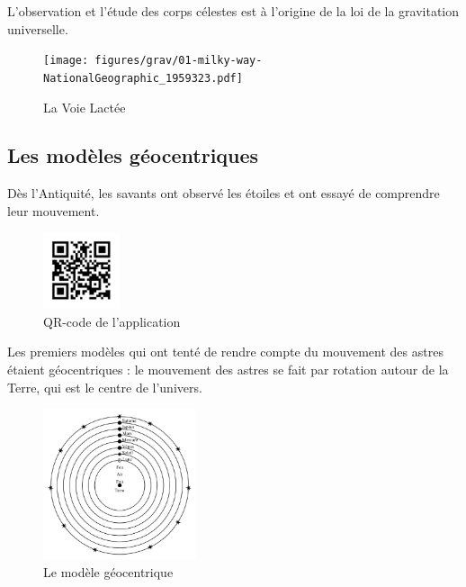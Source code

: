 \documentclass[
  letterpaper,
  DIV=11,
  numbers=noendperiod]{scrartcl}
\theoremstyle{definition}
\theoremstyle{definition}
\theoremstyle{definition}
\theoremstyle{remark}
\begin{document}
L'observation et l'étude des corps célestes est à l'origine de la loi de
la gravitation universelle.

\begin{figure}[H]

{\centering \texttt{[image: figures/grav/01-milky-way-NationalGeographic\_1959323.pdf]}

}

\caption{La Voie Lactée}

\end{figure}%

\subsection{Les modèles
géocentriques}\label{les-moduxe8les-guxe9ocentriques}

Dès l'Antiquité, les savants ont observé les étoiles et ont essayé de
comprendre leur mouvement.

\begin{figure}[H]

{\centering \includegraphics[width=0.2\textwidth,height=\textheight]{figures/grav/stell.pdf}

}

\caption{QR-code de l'application}

\end{figure}%

Les premiers modèles qui ont tenté de rendre compte du mouvement des
astres étaient géocentriques : le mouvement des astres se fait par
rotation autour de la Terre, qui est le centre de l'univers.

\begin{figure}[H]

{\centering \includegraphics[width=0.4\textwidth,height=\textheight]{figures/grav/geo.pdf}

}

\caption{Le modèle géocentrique}

\end{figure}%
\end{document}
